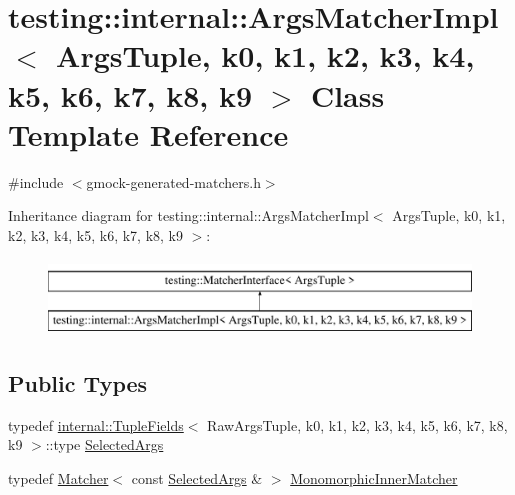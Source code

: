 \hypertarget{classtesting_1_1internal_1_1ArgsMatcherImpl}{}\section{testing\+::internal\+::Args\+Matcher\+Impl$<$ Args\+Tuple, k0, k1, k2, k3, k4, k5, k6, k7, k8, k9 $>$ Class Template Reference}
\label{classtesting_1_1internal_1_1ArgsMatcherImpl}


{\ttfamily \#include $<$gmock-\/generated-\/matchers.\+h$>$}

Inheritance diagram for testing\+::internal\+::Args\+Matcher\+Impl$<$ Args\+Tuple, k0, k1, k2, k3, k4, k5, k6, k7, k8, k9 $>$\+:\begin{figure}[H]
\begin{center}
\leavevmode
\includegraphics[height=2.000000cm]{classtesting_1_1internal_1_1ArgsMatcherImpl}
\end{center}
\end{figure}
\subsection*{Public Types}
\begin{DoxyCompactItemize}
\item 
typedef \mbox{\hyperlink{classtesting_1_1internal_1_1TupleFields}{internal\+::\+Tuple\+Fields}}$<$ Raw\+Args\+Tuple, k0, k1, k2, k3, k4, k5, k6, k7, k8, k9 $>$\+::type \mbox{\hyperlink{classtesting_1_1internal_1_1ArgsMatcherImpl_ab061679f6251e56ccbedaf0c316d00ff}{Selected\+Args}}
\item 
typedef \mbox{\hyperlink{classtesting_1_1Matcher}{Matcher}}$<$ const \mbox{\hyperlink{classtesting_1_1internal_1_1ArgsMatcherImpl_ab061679f6251e56ccbedaf0c316d00ff}{Selected\+Args}} \& $>$ \mbox{\hyperlink{classtesting_1_1internal_1_1ArgsMatcherImpl_ab90d2c074b2072d6c39bf26209fb941f}{Monomorphic\+Inner\+Matcher}}
\end{DoxyCompactItemize}
